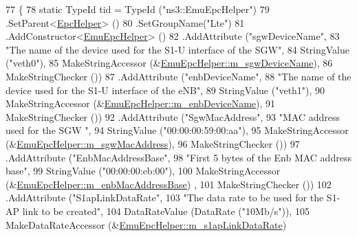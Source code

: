 \begin{DoxyCode}
77 \{
78   \textcolor{keyword}{static} TypeId tid = TypeId (\textcolor{stringliteral}{"ns3::EmuEpcHelper"})
79     .SetParent<\hyperlink{classns3_1_1EpcHelper_a419929e12a2c6273eb48cb766064436b}{EpcHelper}> ()
80     .SetGroupName(\textcolor{stringliteral}{"Lte"})
81     .AddConstructor<\hyperlink{classns3_1_1EmuEpcHelper_a10b42d66910c4ee73006f40eea1a1de1}{EmuEpcHelper}> ()
82     .AddAttribute (\textcolor{stringliteral}{"sgwDeviceName"}, 
83                    \textcolor{stringliteral}{"The name of the device used for the S1-U interface of the SGW"},
84                    StringValue (\textcolor{stringliteral}{"veth0"}),
85                    MakeStringAccessor (&\hyperlink{classns3_1_1EmuEpcHelper_aaf7c6410b27ea82a8fabc136801bf0d4}{EmuEpcHelper::m\_sgwDeviceName}),
86                    MakeStringChecker ())
87     .AddAttribute (\textcolor{stringliteral}{"enbDeviceName"}, 
88                    \textcolor{stringliteral}{"The name of the device used for the S1-U interface of the eNB"},
89                    StringValue (\textcolor{stringliteral}{"veth1"}),
90                    MakeStringAccessor (&\hyperlink{classns3_1_1EmuEpcHelper_a6bd1148381a5fb8d14a20673b4d50420}{EmuEpcHelper::m\_enbDeviceName}),
91                    MakeStringChecker ())
92     .AddAttribute (\textcolor{stringliteral}{"SgwMacAddress"}, 
93                    \textcolor{stringliteral}{"MAC address used for the SGW "},
94                    StringValue (\textcolor{stringliteral}{"00:00:00:59:00:aa"}),
95                    MakeStringAccessor (&\hyperlink{classns3_1_1EmuEpcHelper_abb2f5dec50c8361cb99e11c9c688bf5c}{EmuEpcHelper::m\_sgwMacAddress}),
96                    MakeStringChecker ())
97     .AddAttribute (\textcolor{stringliteral}{"EnbMacAddressBase"}, 
98                    \textcolor{stringliteral}{"First 5 bytes of the Enb MAC address base"},
99                    StringValue (\textcolor{stringliteral}{"00:00:00:eb:00"}),
100                    MakeStringAccessor (&\hyperlink{classns3_1_1EmuEpcHelper_a5958f60d6b9a984edace5ee351188e39}{EmuEpcHelper::m\_enbMacAddressBase})
      ,
101                    MakeStringChecker ())
102     .AddAttribute (\textcolor{stringliteral}{"S1apLinkDataRate"}, 
103                    \textcolor{stringliteral}{"The data rate to be used for the S1-AP link to be created"},
104                    DataRateValue (DataRate (\textcolor{stringliteral}{"10Mb/s"})),
105                    MakeDataRateAccessor (&\hyperlink{classns3_1_1EmuEpcHelper_ac0b5058393492c89ecacfe6324cdef69}{EmuEpcHelper::m\_s1apLinkDataRate})

\end{DoxyCode}
